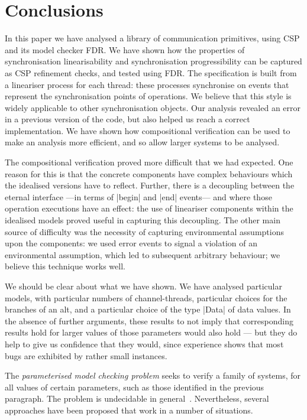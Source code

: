 \section{Conclusions}
\label{sec:conc}

In this paper we have analysed a library of communication primitives, using
CSP and its model checker FDR\@.  We have shown how the properties of
synchronisation linearisability and synchronisation progressibility can be
captured as CSP refinement checks, and tested using FDR.  The specification is
built from a lineariser process for each thread: these processes synchronise
on events that represent the synchronisation points of operations.  We believe
that this style is widely applicable to other synchronisation objects.
%
Our analysis revealed an error in a previous version of the code, but also
helped us reach a correct implementation.  We have shown how compositional
verification can be used to make an analysis more efficient, and so allow
larger systems to be analysed.

The compositional verification proved more difficult that we had expected.
One reason for this is that the concrete components have complex behaviours
which the idealised versions have to reflect.  Further, there is a decoupling
between the eternal interface ---in terms of |begin| and |end| events--- and
where those operation executions have an effect: the use of lineariser
components within the idealised models proved useful in capturing this
decoupling.  The other main source of difficulty was the necessity of
capturing environmental assumptions upon the components: we used error events
to signal a violation of an environmental assumption, which led to subsequent
arbitrary behaviour; we believe this technique works well.

We should be clear about what we have shown.  We have analysed particular
models, with particular numbers of channel-threads, particular choices for the
branches of an alt, and a particular choice of the type |Data| of data values.
In the absence of further arguments, these results to not imply that
corresponding results hold for larger values of those parameters would also
hold --- but they do help to give us confidence that they would, since
experience shows that most bugs are exhibited by rather small instances.

The \emph{parameterised model checking problem} seeks to verify a family of
systems, for all values of certain parameters, such as those identified in the
previous paragraph.  The problem is undecidable in general~\cite{apt-kozen,
  tomasz-gavin-CA}.  Nevertheless, several approaches have been proposed that
work in a number of situations.

